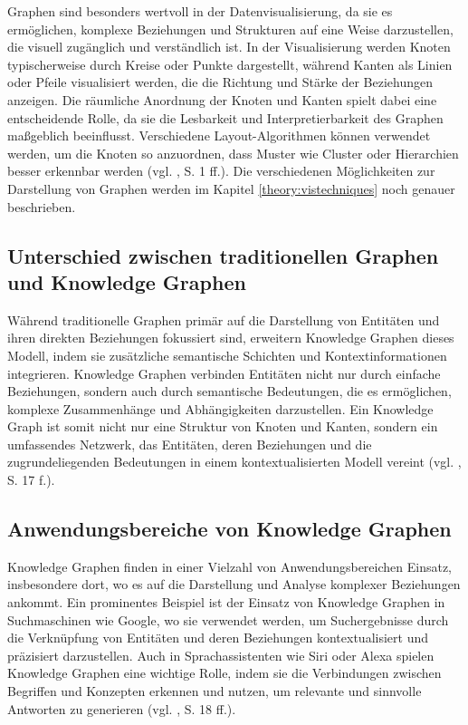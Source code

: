 Graphen sind besonders wertvoll in der Datenvisualisierung, da sie es ermöglichen, komplexe Beziehungen und Strukturen auf eine Weise darzustellen, die visuell zugänglich und verständlich ist. In der Visualisierung werden Knoten typischerweise durch Kreise oder Punkte dargestellt, während Kanten als Linien oder Pfeile visualisiert werden, die die Richtung und Stärke der Beziehungen anzeigen. Die räumliche Anordnung der Knoten und Kanten spielt dabei eine entscheidende Rolle, da sie die Lesbarkeit und Interpretierbarkeit des Graphen maßgeblich beeinflusst. Verschiedene Layout-Algorithmen können verwendet werden, um die Knoten so anzuordnen, dass Muster wie Cluster oder Hierarchien besser erkennbar werden (vgl. \cite{graphIntroduction:Wilson}, S. 1 ff.). Die verschiedenen Möglichkeiten zur Darstellung von Graphen werden im Kapitel \ref{theory:vistechniques} noch genauer beschrieben.

\subsection{Unterschied zwischen traditionellen Graphen und Knowledge Graphen}

Während traditionelle Graphen primär auf die Darstellung von Entitäten und ihren direkten Beziehungen fokussiert sind, erweitern Knowledge Graphen dieses Modell, indem sie zusätzliche semantische Schichten und Kontextinformationen integrieren. Knowledge Graphen verbinden Entitäten nicht nur durch einfache Beziehungen, sondern auch durch semantische Bedeutungen, die es ermöglichen, komplexe Zusammenhänge und Abhängigkeiten darzustellen. Ein Knowledge Graph ist somit nicht nur eine Struktur von Knoten und Kanten, sondern ein umfassendes Netzwerk, das Entitäten, deren Beziehungen und die zugrundeliegenden Bedeutungen in einem kontextualisierten Modell vereint (vgl. \cite{knowledgeGraphIntroduction:Chaudhri}, S. 17 f.).

\subsection{Anwendungsbereiche von Knowledge Graphen}

Knowledge Graphen finden in einer Vielzahl von Anwendungsbereichen Einsatz, insbesondere dort, wo es auf die Darstellung und Analyse komplexer Beziehungen ankommt. Ein prominentes Beispiel ist der Einsatz von Knowledge Graphen in Suchmaschinen wie Google, wo sie verwendet werden, um Suchergebnisse durch die Verknüpfung von Entitäten und deren Beziehungen kontextualisiert und präzisiert darzustellen. Auch in Sprachassistenten wie Siri oder Alexa spielen Knowledge Graphen eine wichtige Rolle, indem sie die Verbindungen zwischen Begriffen und Konzepten erkennen und nutzen, um relevante und sinnvolle Antworten zu generieren (vgl. \cite{knowledgeGraphIntroduction:Chaudhri}, S. 18 ff.).

